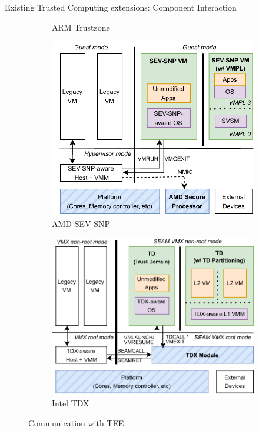 \documentclass[aspectratio=169]{beamer}
\begin{document}
\begin{frame}{Existing Trusted Computing extensions: Component Interaction}
\begin{figure}
\begin{subfigure}[]{0.23\textwidth}
            \caption{ARM Trustzone}
        \end{subfigure}
        \begin{subfigure}[]{0.23\textwidth}
            \includegraphics[width=\textwidth]{images/svm-snp.png}
            \caption{AMD SEV-SNP}
        \end{subfigure}
        \begin{subfigure}[]{0.23\textwidth}
            \includegraphics[width=\textwidth]{images/tdx.png}
            \caption{Intel TDX}
        \end{subfigure}
        \caption{Communication with TEE}
    \end{figure}
\end{frame}
\end{document}
